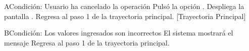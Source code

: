 	\begin{UCtrayectoriaA}{A}{Condición: Usuario ha cancelado la operación}
		\UCpaso[\UCactor] Pulsó la opción .
		\UCpaso[\UCsist] Despliega la pantalla .
		\UCpaso[\UCsist] Regresa al paso 1 de la trayectoria principal. [Trayectoria Principal]
	\end{UCtrayectoriaA}

	\begin{UCtrayectoriaA}{B}{Condición: Los valores ingresados son incorrectos}
		\UCpaso[\UCsist] El sistema mostrará el mensaje 
		\UCpaso[\UCsist] Regresa al paso 1 de la trayectoria principal. 
	\end{UCtrayectoriaA}

